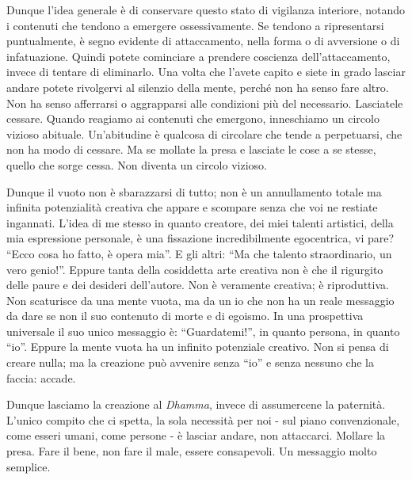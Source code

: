 Dunque l'idea generale è di conservare questo stato di vigilanza
interiore, notando i contenuti che tendono a emergere ossessivamente. Se
tendono a ripresentarsi puntualmente, è segno evidente di attaccamento,
nella forma o di avversione o di infatuazione. Quindi potete cominciare
a prendere coscienza dell'attaccamento, invece di tentare di eliminarlo.
Una volta che l'avete capito e siete in grado lasciar andare potete
rivolgervi al silenzio della mente, perché non ha senso fare altro. Non
ha senso afferrarsi o aggrapparsi alle condizioni più del necessario.
Lasciatele cessare. Quando reagiamo ai contenuti che emergono,
inneschiamo un circolo vizioso abituale. Un'abitudine è qualcosa di
circolare che tende a perpetuarsi, che non ha modo di cessare. Ma se
mollate la presa e lasciate le cose a se stesse, quello che sorge cessa.
Non diventa un circolo vizioso.

Dunque il vuoto non è sbarazzarsi di tutto; non è un annullamento totale
ma infinita potenzialità creativa che appare e scompare senza che voi ne
restiate ingannati. L'idea di me stesso in quanto creatore, dei miei
talenti artistici, della mia espressione personale, è una fissazione
incredibilmente egocentrica, vi pare? ``Ecco cosa ho fatto, è opera mia''.
E gli altri: ``Ma che talento straordinario, un vero genio!''. Eppure
tanta della cosiddetta arte creativa non è che il rigurgito delle paure
e dei desideri dell'autore. Non è veramente creativa; è riproduttiva.
Non scaturisce da una mente vuota, ma da un io che non ha un reale
messaggio da dare se non il suo contenuto di morte e di egoismo. In una
prospettiva universale il suo unico messaggio è: ``Guardatemi!'', in
quanto persona, in quanto ``io''. Eppure la mente vuota ha un infinito
potenziale creativo. Non si pensa di creare nulla; ma la creazione può
avvenire senza ``io'' e senza nessuno che la faccia: accade.

Dunque lasciamo la creazione al \textit{Dhamma}, invece di assumercene la
paternità. L'unico compito che ci spetta, la sola necessità per noi -
sul piano convenzionale, come esseri umani, come persone - è lasciar
andare, non attaccarci. Mollare la presa. Fare il bene, non fare il
male, essere consapevoli. Un messaggio molto semplice.


